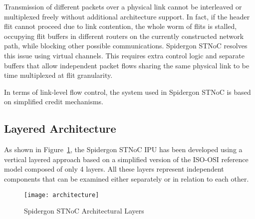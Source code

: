 Transmission of different packets over a physical link cannot be interleaved or multiplexed freely without additional architecture support. 
In fact, if the header flit cannot proceed due to link contention, the whole worm of flits is stalled, occupying flit buffers in different routers on the currently constructed network path, while blocking other possible communications. 
Spidergon STNoC resolves this issue using virtual channels. 
This requires extra control logic and separate buffers that allow independent packet flows sharing the same physical link to be time multiplexed at flit granularity.

In terms of link-level flow control, the system used in Spidergon STNoC is based on simplified credit mechanisms.

\subsection{Layered Architecture}\label{S:architecture}

As shown in Figure~\ref{fig:architecture}, the Spidergon STNoC IPU has been developed using a vertical layered approach based on a simplified version of the ISO-OSI reference model composed of only 4 layers. 
All these layers represent independent components that can be examined either separately or in relation to each other.

	\begin{figure}[ht]
	\centering
		\texttt{[image: architecture]}
		\caption{Spidergon STNoC Architectural Layers}
		\label{fig:architecture}
	\end{figure}

